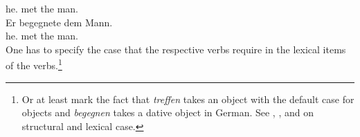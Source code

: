 \begin{exe}
\begin{xlist}[iv.]
\begin{exe}
\begin{xlist}[iv.]
     he.\nom{} met the man.\acc{}\\
\ex 
\gll Er begegnete dem Mann.\\
     he.\nom{} met the man.\dat{}\\
\zl
One has to specify the case that the respective verbs require in the lexical items of the verbs.\footnote{
  Or at least mark the fact that \emph{treffen} takes an object with the default case for
  objects and \emph{begegnen} takes a dative object in German. See , , and
   on structural and lexical case.
}
%


\end{xlist}
\end{exe}
\end{xlist}
\end{exe}
